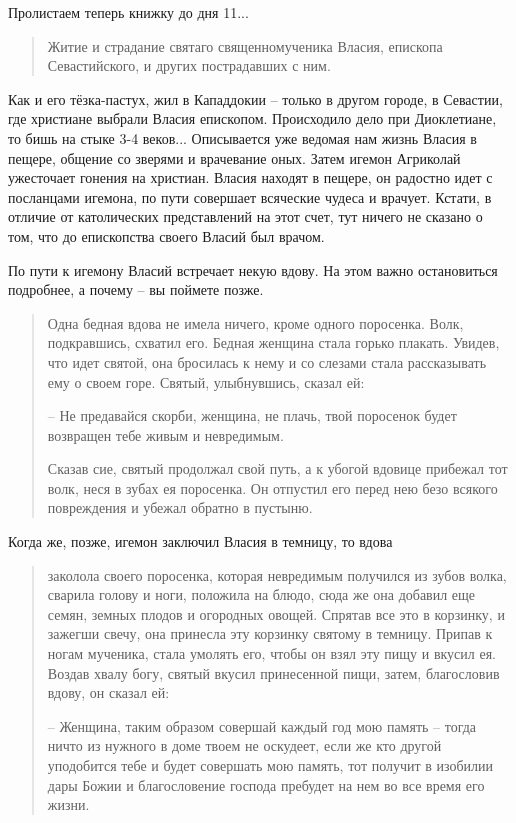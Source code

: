 Пролистаем теперь книжку до дня 11...

\begin{quotation}
Житие и страдание святаго священномученика Власия, епископа Севастийского, и других пострадавших с ним.\end{quotation}

   Как и его тёзка-пастух, жил в Кападдокии – только в другом городе, в Севастии, где христиане выбрали Власия епископом. Происходило дело при Диоклетиане, то бишь на стыке 3-4 веков... Описывается уже ведомая нам жизнь Власия в пещере, общение со зверями и врачевание оных. Затем игемон Агриколай ужесточает гонения на христиан. Власия находят в пещере, он радостно идет с посланцами игемона, по пути совершает всяческие чудеса и врачует. Кстати, в отличие от католических представлений на этот счет, тут ничего не сказано о том, что до епископства своего Власий был врачом. 

   По пути к игемону Власий встречает некую вдову. На этом важно остановиться подробнее, а почему – вы поймете позже.

\begin{quotation}
Одна бедная вдова не имела ничего, кроме одного поросенка. Волк, подкравшись, схватил его. Бедная женщина стала горько плакать. Увидев, что идет святой, она бросилась к нему и со слезами стала рассказывать ему о своем горе. Святый, улыбнувшись, сказал ей:

 – Не предавайся скорби, женщина, не плачь, твой поросенок будет возвращен тебе живым и невредимым.

   Сказав сие, святый продолжал свой путь, а к убогой вдовице прибежал тот волк, неся в зубах ея поросенка. Он отпустил его перед нею безо всякого повреждения и убежал обратно в пустыню.
\end{quotation}

Когда же, позже, игемон заключил Власия в темницу, то вдова

\begin{quotation}
заколола своего поросенка, которая невредимым получился из зубов волка, сварила голову и ноги, положила на блюдо, сюда же она добавил еще семян, земных плодов и огородных овощей. Спрятав все это в корзинку, и зажегши свечу, она принесла эту корзинку святому в темницу. Припав к ногам мученика, стала умолять его, чтобы он взял эту пищу и вкусил ея. Воздав хвалу богу, святый вкусил принесенной пищи, затем, благословив вдову, он сказал ей:

 – Женщина, таким образом совершай каждый год мою память – тогда ничто из нужного в доме твоем не оскудеет, если же кто другой уподобится тебе и будет совершать мою память, тот получит в изобилии дары Божии и благословение господа пребудет на нем во все время его жизни.
\end{quotation}

